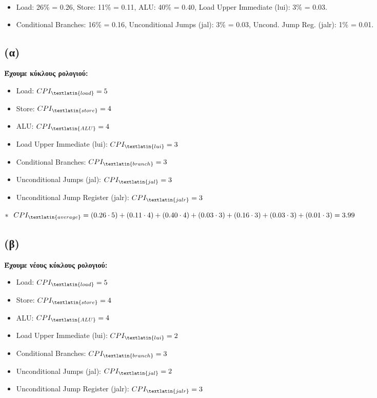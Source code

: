 \documentclass{article}
\newcommand{\skato}{\hspace{0.25cm}}
\begin{document}
\begin{itemize}
    \item \textlatin{Load}: 26\% = 0.26, \skato \textlatin{Store}: 11\% = 0.11, \skato \textlatin{ALU}: 40\% = 0.40, \skato \textlatin{Load Upper Immediate (lui)}: 3\% = 0.03.
    \item \textlatin{Conditional Branches}: 16\% = 0.16, \skato \textlatin{Unconditional Jumps (jal)}: 3\% = 0.03, \skato \textlatin{Uncond. Jump Reg. (jalr)}: 1\% = 0.01.
\end{itemize}


\subsection*{\textbf{(α)}}

\textbf{Έχουμε κύκλους ρολογιού:}
\begin{itemize}
    \item \textlatin{Load}: \( CPI_{\textlatin{load}} = 5 \)
    \item \textlatin{Store}: \( CPI_{\textlatin{store}} = 4 \)
    \item \textlatin{ALU}: \( CPI_{\textlatin{ALU}} = 4 \)
    \item \textlatin{Load Upper Immediate (lui)}: \( CPI_{\textlatin{lui}} = 3 \)
    \item \textlatin{Conditional Branches}: \( CPI_{\textlatin{branch}} = 3 \)
    \item \textlatin{Unconditional Jumps (jal)}: \( CPI_{\textlatin{jal}} = 3 \)
    \item \textlatin{Unconditional Jump Register (jalr)}: \( CPI_{\textlatin{jalr}} = 3 \)
\end{itemize}


$
* \skato  CPI_{\textlatin{average}} = (0.26 \cdot 5) + (0.11 \cdot 4) + (0.40 \cdot 4) + (0.03 \cdot 3) + (0.16 \cdot 3) + (0.03 \cdot 3) + (0.01 \cdot 3) = 3.99
$


\subsection*{\textbf{(β)}}

\textbf{Έχουμε νέους κύκλους ρολογιού:}
\begin{itemize}
    \item \textlatin{Load}: \( CPI_{\textlatin{load}} = 5 \)
    \item \textlatin{Store}: \( CPI_{\textlatin{store}} = 4 \)
    \item \textlatin{ALU}: \( CPI_{\textlatin{ALU}} = 4 \)
    \item \textlatin{Load Upper Immediate (lui)}: \( CPI_{\textlatin{lui}} = 2 \)
    \item \textlatin{Conditional Branches}: \( CPI_{\textlatin{branch}} = 3 \)
    \item \textlatin{Unconditional Jumps (jal)}: \( CPI_{\textlatin{jal}} = 2 \)
    \item \textlatin{Unconditional Jump Register (jalr)}: \( CPI_{\textlatin{jalr}} = 3 \)
\end{itemize}
\end{document}
